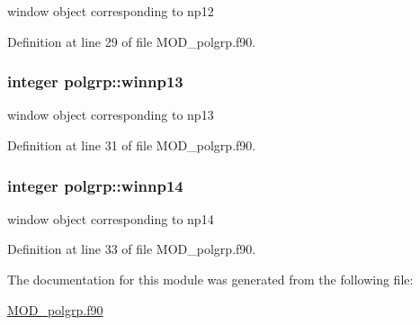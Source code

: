 window object corresponding to np12 



Definition at line 29 of file M\-O\-D\-\_\-polgrp.\-f90.

\hypertarget{classpolgrp_a5f1f4493530a9bbfe87e67c1eedf6e06}{
\subsubsection[{winnp13}]{\setlength{\rightskip}{0pt plus 5cm}integer polgrp\-::winnp13}}\label{classpolgrp_a5f1f4493530a9bbfe87e67c1eedf6e06}


window object corresponding to np13 



Definition at line 31 of file M\-O\-D\-\_\-polgrp.\-f90.

\hypertarget{classpolgrp_ac8105e0df2c1da60cad892c39387eabd}{
\subsubsection[{winnp14}]{\setlength{\rightskip}{0pt plus 5cm}integer polgrp\-::winnp14}}\label{classpolgrp_ac8105e0df2c1da60cad892c39387eabd}


window object corresponding to np14 



Definition at line 33 of file M\-O\-D\-\_\-polgrp.\-f90.



The documentation for this module was generated from the following file\-:\begin{DoxyCompactItemize}
\item 
\hyperlink{MOD__polgrp_8f90}{M\-O\-D\-\_\-polgrp.\-f90}\end{DoxyCompactItemize}
